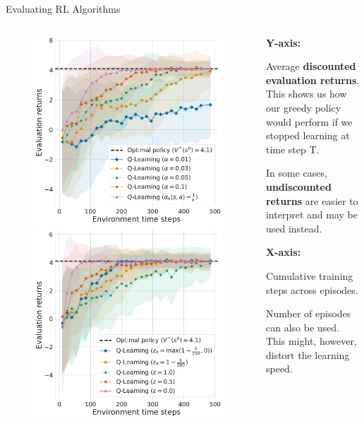 \begin{frame}{Evaluating RL Algorithms}
\begin{columns}
\begin{column}{0.5\textwidth}
\begin{figure}
            \includegraphics[width=0.45\linewidth, height=0.45\textheight, keepaspectratio]{images/chapter_2/tabular_mdp_ql_alphas_returns.pdf}
            \hspace{5pt} %
            \includegraphics[width=0.45\linewidth, height=0.45\textheight, keepaspectratio]{images/chapter_2/tabular_mdp_ql_eps_returns.pdf}
        \end{figure}
        \end{column}
        \begin{column}{0.5\textwidth}
            
            \textbf{Y-axis:}

            \blist
                \item {\small Average \textbf{discounted evaluation returns}. This shows us how our greedy policy would perform if we stopped learning at time step T.} 
                \item {\small In some cases, \textbf{undiscounted returns} are easier to interpret and may be used instead. }
            \elist
            
            \textbf{X-axis:}
            \blist 
                \item {\small Cumulative training steps across episodes.} 
                \item {\small Number of episodes can also be used. This might, however, distort the learning speed.} 
            \elist
        \end{column}
        
    \end{columns}

\end{frame}

